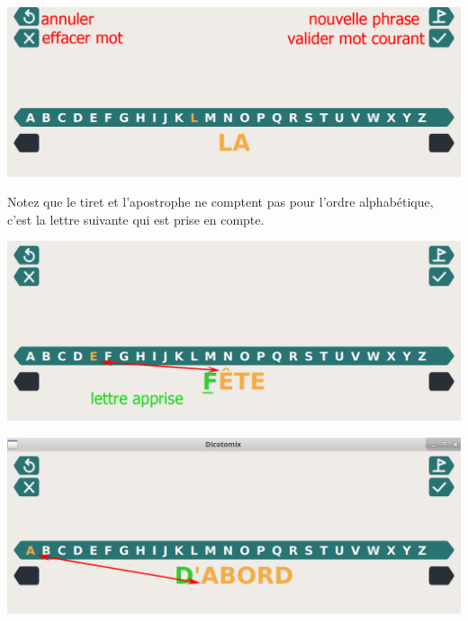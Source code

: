 \documentclass[french]{article}
\begin{document}
\begin{center}
	\includegraphics[scale=0.22]{vierge}
\end{center}
Notez que le tiret et l'apostrophe ne comptent pas pour l'ordre alphabétique, c'est la lettre suivante qui est prise en compte.
\\
\begin{center}
	\includegraphics[scale=0.22]{encours}
\end{center}
\begin{center}
	\includegraphics[scale=0.22]{apostrophe}
\end{center}
\end{document}
